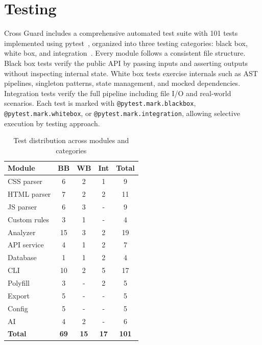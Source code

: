 \section{Testing}
\label{sec:testing}

Cross Guard includes a comprehensive automated test suite with 101 tests implemented using pytest~\cite{pytestdocs}, organized into three testing categories: black box, white box, and integration~\cite{myers2011testing}. Every module follows a consistent file structure. Black box tests verify the public API by passing inputs and asserting outputs without inspecting internal state. White box tests exercise internals such as AST pipelines, singleton patterns, state management, and mocked dependencies. Integration tests verify the full pipeline including file I/O and real-world scenarios. Each test is marked with \texttt{@pytest.mark.blackbox}, \texttt{@pytest.mark.whitebox}, or \texttt{@pytest.mark.integration}, allowing selective execution by testing approach.

\begin{table}[H]
    \centering
    \begin{tabular}{|l|c|c|c|c|}
        \hline
        \textbf{Module} & \textbf{BB} & \textbf{WB} & \textbf{Int} & \textbf{Total} \\
        \hline \hline
        CSS parser    & 6  & 2 & 1 & 9  \\ \hline
        HTML parser   & 7  & 2 & 2 & 11 \\ \hline
        JS parser     & 6  & 3 & - & 9  \\ \hline
        Custom rules  & 3  & 1 & - & 4  \\ \hline
        Analyzer      & 15 & 3 & 2 & 19 \\ \hline
        API service   & 4  & 1 & 2 & 7  \\ \hline
        Database      & 1  & 1 & 2 & 4  \\ \hline
        CLI           & 10  & 2 & 5 & 17 \\ \hline
        Polyfill      & 3  & - & 2 & 5  \\ \hline
        Export        & 5  & - & - & 5  \\ \hline
        Config        & 5  & - & - & 5  \\ \hline
        AI            & 4  & 2 & - & 6  \\ \hline
        \textbf{Total} & \textbf{69} & \textbf{15} & \textbf{17} & \textbf{101} \\ \hline
    \end{tabular}
    \caption{Test distribution across modules and categories}
    \label{tab:test-distribution}
\end{table}


